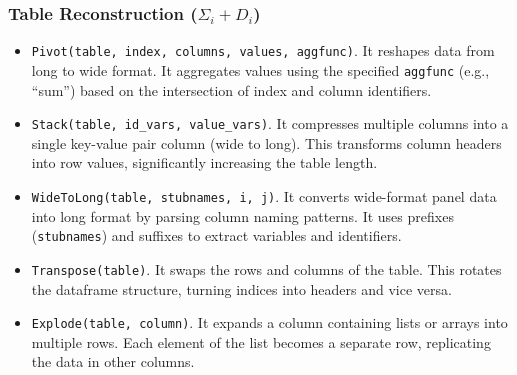 \subsubsection{Table Reconstruction ($\Sigma_i + D_i$)}
\begin{itemize}[leftmargin=1em]
    \item \texttt{Pivot(table, index, columns, values, aggfunc)}. It reshapes data from long to wide format. It aggregates values using the specified \texttt{aggfunc} (e.g., ``sum'') based on the intersection of index and column identifiers.
    \item \texttt{Stack(table, id\_vars, value\_vars)}. It compresses multiple columns into a single key-value pair column (wide to long). This transforms column headers into row values, significantly increasing the table length.
    \item \texttt{WideToLong(table, stubnames, i, j)}. It converts wide-format panel data into long format by parsing column naming patterns. It uses prefixes (\texttt{stubnames}) and suffixes to extract variables and identifiers.
    \item \texttt{Transpose(table)}. It swaps the rows and columns of the table. This rotates the dataframe structure, turning indices into headers and vice versa.
    \item \texttt{Explode(table, column)}. It expands a column containing lists or arrays into multiple rows. Each element of the list becomes a separate row, replicating the data in other columns.
\end{itemize}

